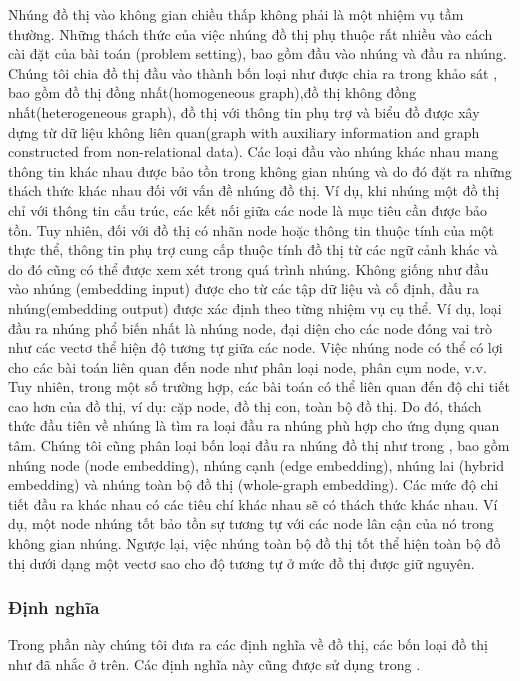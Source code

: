 Nhúng đồ thị vào không gian chiều thấp không phải là một nhiệm vụ tầm thường. Những thách thức của việc nhúng đồ thị phụ thuộc rất nhiều vào cách cài đặt của bài toán (problem setting), bao gồm đầu vào nhúng và đầu ra nhúng. Chúng tôi chia đồ thị đầu vào thành bốn loại như được chia ra trong khảo sát \cite{cai2018comprehensive}, bao gồm đồ thị đồng nhất(homogeneous graph),đồ thị không đồng nhất(heterogeneous graph), đồ thị với thông tin phụ trợ và biểu đồ được xây dựng từ dữ liệu không liên quan(graph with auxiliary information and graph constructed from non-relational data). Các loại đầu vào nhúng khác nhau mang thông tin khác nhau được bảo tồn trong không gian nhúng và do đó đặt ra những thách thức khác nhau đối với vấn đề nhúng đồ thị. Ví dụ, khi nhúng một đồ thị chỉ với thông tin cấu trúc, các kết nối giữa các node là mục tiêu cần được bảo tồn. Tuy nhiên, đối với đồ thị có nhãn node hoặc thông tin thuộc tính của một thực thể, thông tin phụ trợ cung cấp thuộc tính đồ thị từ các ngữ cảnh khác và do đó cũng có thể được xem xét trong quá trình nhúng. Không giống như đầu vào nhúng (embedding input) được cho từ các tập dữ liệu và cố định, đầu ra nhúng(embedding output) được xác định theo từng nhiệm vụ cụ thể. Ví dụ, loại đầu ra nhúng phổ biến nhất là nhúng node, đại diện cho các node đóng vai trò như các vectơ thể hiện độ tương tự giữa các node. Việc nhúng node có thể có lợi cho các bài toán liên quan đến node như phân loại node, phân cụm node, v.v. Tuy nhiên, trong một số trường hợp, các bài toán có thể liên quan đến độ chi tiết cao hơn của đồ thị, ví dụ: cặp node, đồ thị con, toàn bộ đồ thị. Do đó, thách thức đầu tiên về nhúng là tìm ra loại đầu ra nhúng phù hợp cho ứng dụng quan tâm. Chúng tôi cũng phân loại bốn loại đầu ra nhúng đồ thị như trong \cite{cai2018comprehensive}, bao gồm nhúng node (node embedding), nhúng cạnh (edge embedding), nhúng lai (hybrid embedding) và nhúng toàn bộ đồ thị (whole-graph embedding). Các mức độ chi tiết đầu ra khác nhau có các tiêu chí khác nhau sẽ có thách thức khác nhau. Ví dụ, một node nhúng tốt bảo tồn sự tương tự với các node lân cận của nó trong không gian nhúng. Ngược lại, việc nhúng toàn bộ đồ thị tốt thể hiện toàn bộ đồ thị dưới dạng một vectơ sao cho độ tương tự ở mức đồ thị được giữ nguyên.

\subsubsection{Định nghĩa}
Trong phần này chúng tôi đưa ra các định nghĩa về đồ thị, các bốn loại đồ thị như đã nhắc ở trên. Các định nghĩa này cũng được sử dụng trong \cite{cai2018comprehensive}.


